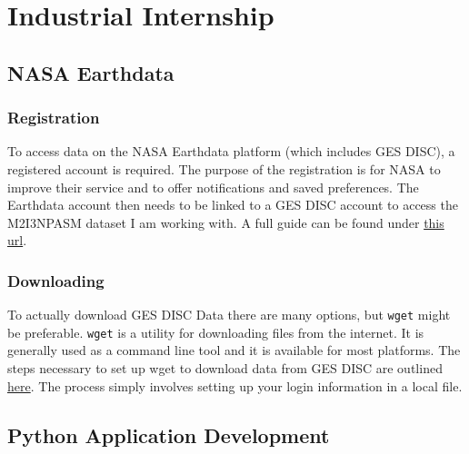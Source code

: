 \documentclass[../00_main.tex]{subfiles}
\begin{document}
\section{Industrial Internship}

\subsection{NASA Earthdata}

\subsubsection{Registration}

To access data on the NASA Earthdata platform (which includes GES DISC),
a registered account is required. The purpose of the registration is for NASA
to improve their service and to offer notifications and saved preferences.
The Earthdata account then needs to be linked to a GES DISC account to access
the M2I3NPASM dataset I am working with. A full guide can be found under 
\href{https://www.unidata.ucar.edu/software/netcdf/}{this url}.

\subsubsection{Downloading}

To actually download GES DISC Data there are many options, but \texttt{wget}
might be preferable. \texttt{wget} is a utility for downloading files from the
internet. It is generally used as a command line tool and it is available for
most platforms. The steps necessary to set up wget to download data from GES
DISC are outlined 
\href{https://disc.gsfc.nasa.gov/data-access#mac_linux_wget}{here}. The process
simply involves setting up your login information in a local file.

\subsection{Python Application Development}
\end{document}
